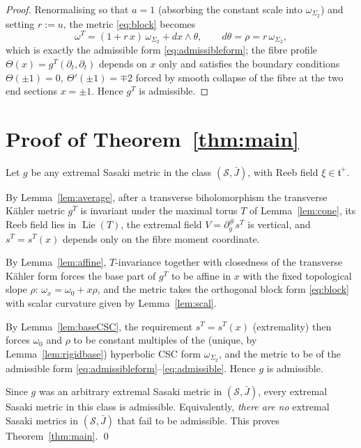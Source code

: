 \documentclass{amsart}
\theoremstyle{definition}
\DeclareMathOperator{\Lie}{Lie}
\begin{document}
\begin{proof}
Renormalising so that $a=1$ (absorbing the constant scale into
$\omega_{\Sigma_2}$) and setting $r:=u$, the metric \eqref{eq:block} becomes
\[
  \omega^T=(1+r\,x)\,\omega_{\Sigma_2}+dx\wedge\theta,\qquad d\theta=\rho=r\,\omega_{\Sigma_2},
\]
which is exactly the admissible form \eqref{eq:admissibleform}; the fibre profile
$\Theta(x)=g^T(\partial_t,\partial_t)$ depends on $x$ only and satisfies the
boundary conditions $\Theta(\pm1)=0,\ \Theta'(\pm1)=\mp2$ forced by smooth
collapse of the fibre at the two end sections $x=\pm1$. Hence $g^T$ is
admissible.
\end{proof}

\section{Proof of Theorem~\ref{thm:main}}

Let $g$ be any extremal Sasaki metric in the class $(\mathcal S,\bar J)$, with
Reeb field $\xi\in\mathfrak t^+$.

By Lemma~\ref{lem:average}, after a transverse biholomorphism the transverse
K\"ahler metric $g^T$ is invariant under the maximal torus $T$ of
Lemma~\ref{lem:cone}, its Reeb field lies in $\Lie(T)$, the extremal field
$V=\partial^\#_g s^T$ is vertical, and $s^T=s^T(x)$ depends only on the fibre
moment coordinate.

By Lemma~\ref{lem:affine}, $T$-invariance together with closedness of the
transverse K\"ahler form forces the base part of $g^T$ to be affine in $x$ with
the fixed topological slope $\rho$: $\omega_x=\omega_0+x\rho$, and the metric
takes the orthogonal block form \eqref{eq:block} with scalar curvature given by
Lemma~\ref{lem:scal}.

By Lemma~\ref{lem:baseCSC}, the requirement $s^T=s^T(x)$ (extremality) then
forces $\omega_0$ and $\rho$ to be constant multiples of the (unique, by
Lemma~\ref{lem:rigidbase}) hyperbolic CSC form $\omega_{\Sigma_2}$, and the
metric to be of the admissible form
\eqref{eq:admissibleform}--\eqref{eq:admissible}. Hence $g$ is admissible.

Since $g$ was an arbitrary extremal Sasaki metric in $(\mathcal S,\bar J)$,
every extremal Sasaki metric in this class is admissible. Equivalently,
\emph{there are no} extremal Sasaki metrics in $(\mathcal S,\bar J)$ that fail
to be admissible. This proves Theorem~\ref{thm:main}. \qed
\end{document}
